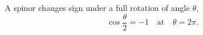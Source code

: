 \documentclass{article}
\begin{document}
A spinor changes sign under a full rotation of angle $\theta$,
\begin{equation}
\cos\frac{\theta}{2} = -1 \quad \text{at} \quad \theta = 2\pi .
\label{eq:full}
\end{equation}
\end{document}
